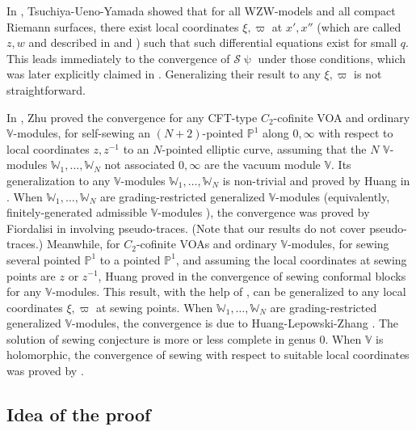 \documentclass[12pt,a4paper,notitlepage]{article}
\theoremstyle{definition}
\theoremstyle{plain}
\newcommand{\mc}{\mathcal}
\newcommand{\Vbb}{\mathbb V}
\newcommand{\Wbb}{\mathbb W}
\newcommand{\Pbb}{\mathbb P}
\numberwithin{equation}{section}
\begin{document}
In \cite{TUY89}, Tsuchiya-Ueno-Yamada showed that for all WZW-models and all compact Riemann surfaces, there exist local coordinates $\xi,\varpi$ at $x',x''$ (which are called $z,w$ and described in \cite[Lemma 6.1.2]{TUY89} and \cite[Lemma 5.3.1]{Ueno97}) such that such differential equations exist for small $q$. This leads immediately to the convergence of $\mc S\uppsi$ under those conditions, which was later explicitly claimed in \cite[Thm. 5.3.4]{Ueno97}. Generalizing their result  to any $\xi,\varpi$ is not  straightforward.  


In \cite{Zhu96}, Zhu proved the convergence for any CFT-type $C_2$-cofinite VOA and ordinary $\Vbb$-modules,  for  self-sewing an $(N+2)$-pointed $\Pbb^1$ along $0,\infty$ with respect to local coordinates $z,z^{-1}$ to an $N$-pointed elliptic curve,  assuming that the $N$  $\Vbb$-modules $\Wbb_1,\dots,\Wbb_N$ not associated $0,\infty$ are the vacuum module $\Vbb$.  Its generalization to any $\Vbb$-modules $\Wbb_1,\dots,\Wbb_N$ is non-trivial and proved by Huang in \cite{Hua05b}. When  $\Wbb_1,\dots,\Wbb_N$ are grading-restricted generalized $\Vbb$-modules  (equivalently, finitely-generated admissible $\Vbb$-modules \cite{Hua09}), the convergence was proved by Fiordalisi in \cite{Fio16} involving pseudo-traces. (Note that our results do not cover pseudo-traces.)  Meanwhile, for $C_2$-cofinite VOAs and ordinary $\Vbb$-modules, for sewing several pointed $\Pbb^1$ to a pointed  $\Pbb^1$, and assuming the local coordinates at sewing points are $z$ or $z^{-1}$, Huang proved in \cite{Hua05a} the convergence of sewing conformal blocks for any $\Vbb$-modules. This result, with the help of \cite{Hua98}, can be generalized to any local coordinates $\xi,\varpi$ at sewing points. When $\Wbb_1,\dots,\Wbb_N$ are grading-restricted generalized $\Vbb$-modules, the convergence is due to Huang-Lepowski-Zhang \cite{HLZ11}.  The solution of sewing conjecture is more or less complete in genus $0$. When $\Vbb$ is holomorphic, the convergence of sewing with respect to suitable local coordinates was proved by \cite{Cod19}.




\subsection*{Idea of the proof}
\end{document}
